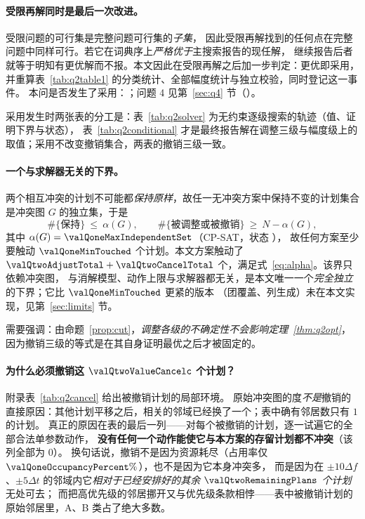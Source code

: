\paragraph{受限再解同时是最后一次改进。}受限问题的可行集是完整问题可行集的\emph{子集}，
因此受限再解找到的任何点在完整问题中同样可行。若它在词典序上\emph{严格优于}主搜索报告的现任解，
继续报告后者就等于明知有更优解而不报。本文因此在受限再解之后加一步判定：更优即采用，
并重算表~\ref{tab:q2table1} 的分类统计、全部幅度统计与独立校验，同时登记这一事件。
本问是否发生了采用：\valQtwoCondAdopted{}；问题 4 见第~\ref{sec:q4} 节（\valQfourCondAdopted{}）。

采用发生时两张表的分工是：表~\ref{tab:q2solver} 为无约束逐级搜索的轨迹（值、证明下界与状态），
表~\ref{tab:q2conditional} 才是最终报告解在调整三级与幅度级上的取值；采用不改变撤销集合，两表的撤销三级一致。


\paragraph{一个与求解器无关的下界。}两个相互冲突的计划不可能都\emph{保持原样}，故任一无冲突方案中保持不变的计划集合
是冲突图 $G$ 的独立集，于是
\begin{equation}\label{eq:alpha}
  \#\{\text{保持}\}\ \le\ \alpha(G),\qquad \#\{\text{被调整或被撤销}\}\ \ge\ N-\alpha(G),
\end{equation}
其中 $\alpha(G)=\valQoneMaxIndependentSet$（CP-SAT，状态 \textsf{\valQoneMaxIndependentSetStatus}），
故任何方案至少要触动 $\valQoneMinTouched$ 个计划。本文方案触动了
$\valQtwoAdjustTotal+\valQtwoCancelTotal$ 个，满足式~\eqref{eq:alpha}。该界只依赖冲突图，
与消解模型、动作上限与求解器都无关，是本文唯一一个\emph{完全独立}的下界；它比 $\valQoneMinTouched$ 更紧的版本
（团覆盖、列生成）未在本文实现，见第~\ref{sec:limits} 节。

需要强调：由命题~\ref{prop:cut}，\emph{调整各级的不确定性不会影响定理~\ref{thm:q2opt}}，
因为撤销三级的等式是在其自身证明最优之后才被固定的。

\paragraph{为什么必须撤销这 $\valQtwoValueCancelc$ 个计划？}附录表~\ref{tab:q2cancel} 给出被撤销计划的局部环境。
原始冲突图的度\emph{不是}撤销的直接原因：其他计划平移之后，相关的邻域已经换了一个；表中确有邻居数只有 $1$ 的计划。
真正的原因在表的最后一列——对每个被撤销的计划，逐一试遍它的全部合法单参数动作，
\textbf{没有任何一个动作能使它与本方案的存留计划都不冲突}（该列全部为 $0$）。
换句话说，撤销不是因为资源耗尽（占用率仅 $\valQoneOccupancyPercent\%$），也不是因为它本身冲突多，
而是因为在 $\pm 10\Delta f$、$\pm 5\Delta t$ 的邻域内它\emph{相对于已经安排好的其余 $\valQtwoRemainingPlans$ 个计划}无处可去；
而把高优先级的邻居挪开又与优先级条款相悖——表中被撤销计划的原始邻居里，A、B 类占了绝大多数。

